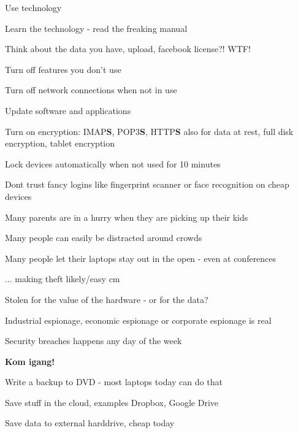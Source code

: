 \documentclass[20pt,landscape,a4paper,footrule]{foils}
\begin{document}

\begin{list1}
\item Use technology
\item Learn the technology - read the freaking manual
\item Think about the data you have, upload, facebook license?! WTF!
\begin{list2}
\item Turn off features you don't use
\item Turn off network connections when not in use
\item Update software and applications
\item Turn on encryption: IMAP{\bf S}, POP3{\bf S},
  HTTP{\bf S} also for data at rest, full disk encryption, tablet encryption
\item Lock devices automatically when not used for 10 minutes
\item Dont trust fancy logins like fingerprint scanner or face recognition on cheap devices
\end{list2}
\end{list1}



\begin{list1}
\item Many parents are in a hurry when they are picking up their kids
\item Many people can easily be distracted around crowds
\item Many people let their laptops stay out in the open - even at conferences
\item ... making theft likely/easy
 cm
\item Stolen for the value of the hardware - or for the data?
\item Industrial espionage, economic espionage or corporate espionage is real
\end{list1}

\centerline{Security breaches happens any day of the week}


\vskip 3cm
\centerline{\LARGE \bf Kom igang!}

\begin{list2}
\item Write a backup to DVD - most laptops today can do that
\item Save stuff in the cloud, examples Dropbox, Google Drive
\item Save data to external harddrive, cheap today
\end{list2}
\end{document}

